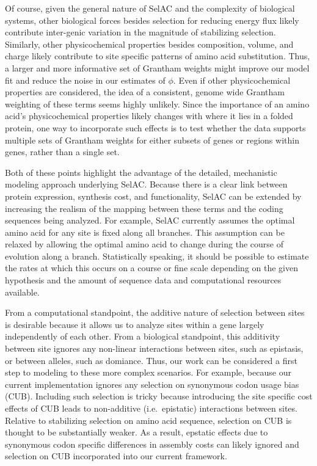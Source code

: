 \documentclass{article}
\newcommand{\selac}{SelAC\xspace}
\begin{document}
Of course, given the general nature of \selac and the complexity of biological systems, other biological forces besides selection for reducing energy flux likely contribute inter-genic variation in the magnitude of stabilizing selection.
Similarly, other physicochemical properties besides composition, volume, and charge likely contribute to site specific patterns of amino acid substitution.
Thus, a larger and more informative set of Grantham weights might improve our model fit and reduce the noise in our estimates of $\phi$.
Even if other physicochemical properties are considered, the idea of a consistent, genome wide Grantham weighting of these terms seems highly unlikely.
Since the importance of an amino acid's physicochemical properties likely changes with where it lies in a folded protein, one way to incorporate such effects is to test whether the data supports multiple sets of Grantham weights for either subsets of genes or regions within genes, rather than a single set.

Both of these points highlight the advantage of the detailed, mechanistic modeling approach underlying \selac.
Because there is a clear link between protein expression, synthesis cost, and functionality, \selac can be extended by increasing the realism of the mapping between these terms and the coding sequences being analyzed.
For example, \selac currently assumes the optimal amino acid for any site is fixed along all branches.
This assumption can be relaxed by allowing the optimal amino acid to change during the course of evolution along a branch.
Statistically speaking, it should be possible to estimate the rates at which this occurs on a course or fine scale depending on the given hypothesis and the amount of sequence data and computational resources available.

From a computational standpoint, the additive nature of selection between sites is desirable because it allows us to analyze sites within a gene largely independently of each other.
  From a biological standpoint, this additivity between site ignores any non-linear interactions between sites, such as epistasis, or between alleles, such as domiance.  Thus, our work can be considered a first step to modeling to these more complex scenarios. 
 For example, because our current implementation ignores any selection on synonymous codon usage bias (CUB).
  Including such selection is tricky because introducing the site specific cost effects of CUB leads to non-additive (i.e.~epistatic) interactions between sites.  Relative to stabilizing selection on amino acid sequence, selection on CUB is thought to be substantially weaker.
  As a result, epstatic effects due to synonymous codon specific differences in assembly costs can likely ignored and selection on CUB incorporated into our current framework.
\end{document}
